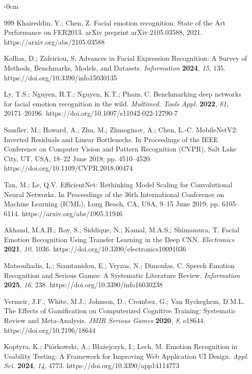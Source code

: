 \documentclass[journal,article,submit,pdftex,moreauthors]{Definitions/mdpi}
\begin{document}
\begin{adjustwidth}{-\extralength}{0cm}
\begin{thebibliography}{999}
		Khaireddin, Y.; Chen, Z. Facial emotion recognition: State of the Art Performance on FER2013. arXiv preprint arXiv:2105.03588, 2021. https://arxiv.org/abs/2105.03588
		
		Kollias, D.; Zafeiriou, S. Advances in Facial Expression Recognition: A Survey of Methods, Benchmarks, Models, and Datasets. {\em Information} {\bf 2024}, {\em 15}, 135. https://doi.org/10.3390/info15030135
		
		Ly, T.S.; Nguyen, H.T.; Nguyen, K.T.; Pham, C. Benchmarking deep networks for facial emotion recognition in the wild. {\em Multimed. Tools Appl.} {\bf 2022}, {\em 81}, 20171--20196. https://doi.org/10.1007/s11042-022-12790-7
		
		Sandler, M.; Howard, A.; Zhu, M.; Zhmoginov, A.; Chen, L.-C. MobileNetV2: Inverted Residuals and Linear Bottlenecks. In Proceedings of the IEEE Conference on Computer Vision and Pattern Recognition (CVPR), Salt Lake City, UT, USA, 18--22 June 2018; pp. 4510--4520. https://doi.org/10.1109/CVPR.2018.00474
		
		Tan, M.; Le, Q.V. EfficientNet: Rethinking Model Scaling for Convolutional Neural Networks. In Proceedings of the 36th International Conference on Machine Learning (ICML), Long Beach, CA, USA, 9--15 June 2019; pp. 6105--6114. https://arxiv.org/abs/1905.11946
		
		Akhand, M.A.H.; Roy, S.; Siddique, N.; Kamal, M.A.S.; Shimamura, T. Facial Emotion Recognition Using Transfer Learning in the Deep CNN. {\em Electronics} {\bf 2021}, {\em 10}, 1036. https://doi.org/10.3390/electronics10091036
		
		Matsouliadis, L.; Siamtanidou, E.; Vryzas, N.; Dimoulas, C. Speech Emotion Recognition and Serious Games: A Systematic Literature Review. {\em Information} {\bf 2025}, {\em 16}, 238. https://doi.org/10.3390/info16030238
		
		Vermeir, J.F.; White, M.J.; Johnson, D.; Crombez, G.; Van Ryckeghem, D.M.L. The Effects of Gamification on Computerized Cognitive Training: Systematic Review and Meta-Analysis. {\em JMIR Serious Games} {\bf 2020}, {\em 8}, e18644. https://doi.org/10.2196/18644
		
		Koptyra, K.; Piórkowski, A.; Błażejczyk, I.; Lech, M. Emotion Recognition in Usability Testing: A Framework for Improving Web Application UI Design. {\em Appl. Sci.} {\bf 2024}, {\em 14}, 4773. https://doi.org/10.3390/app14114773
		

\end{thebibliography}
\end{adjustwidth}
\end{document}
